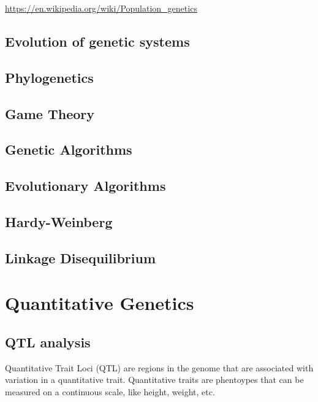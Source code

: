\documentclass[12pt,]{krantz}
\theoremstyle{definition}
\theoremstyle{definition}
\theoremstyle{remark}
\begin{document}
\url{https://en.wikipedia.org/wiki/Population_genetics}

\section{Evolution of genetic
systems}\label{evolution-of-genetic-systems}

\section{Phylogenetics}\label{phylogenetics}

\section{Game Theory}\label{game-theory}

\section{Genetic Algorithms}\label{genetic-algorithms}

\section{Evolutionary Algorithms}\label{evolutionary-algorithms}

\section{Hardy-Weinberg}\label{hardy-weinberg}

\section{Linkage Disequilibrium}\label{linkage-disequilibrium}

\chapter{Quantitative Genetics}\label{quantitative-genetics}

\section{QTL analysis}\label{qtl-analysis}

Quantitative Trait Loci (QTL) are regions in the genome that are
associated with variation in a quantitative trait. Quantitative traits
are phentoypes that can be measured on a continuous scale, like height,
weight, etc.
\end{document}
